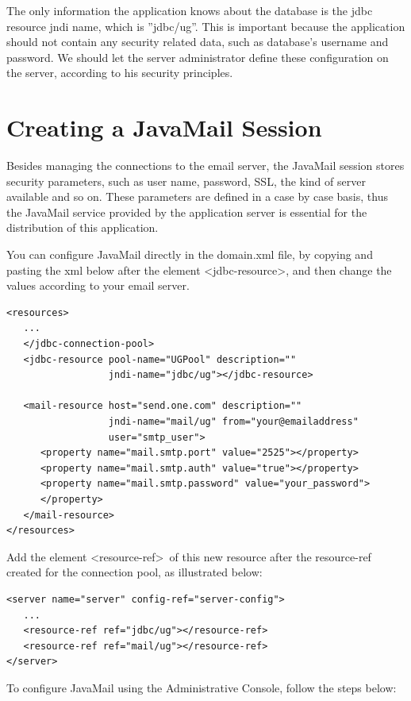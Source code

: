 \documentclass[envcountsame,envcountchap]{svmono}
\begin{document}
The only information the application knows about the database is the jdbc resource jndi name, which is ''jdbc/ug''. This is important because the application should not contain any security related data, such as database's username and password. We should let the server administrator define these configuration on the server, according to his security principles.

\section{Creating a JavaMail Session}

Besides managing the connections to the email server, the JavaMail session stores security parameters, such as user name, password, SSL, the kind of server available and so on. These parameters are defined in a case by case basis, thus the JavaMail service provided by the application server is essential for the distribution of this application.

You can configure JavaMail directly in the domain.xml file, by copying and pasting the xml below after the element \textless jdbc-resource\textgreater, and then change the values according to your email server.

\begin{verbatim}
<resources>
   ...
   </jdbc-connection-pool>
   <jdbc-resource pool-name="UGPool" description="" 
                  jndi-name="jdbc/ug"></jdbc-resource>

   <mail-resource host="send.one.com" description="" 
                  jndi-name="mail/ug" from="your@emailaddress"
                  user="smtp_user">
      <property name="mail.smtp.port" value="2525"></property>
      <property name="mail.smtp.auth" value="true"></property>
      <property name="mail.smtp.password" value="your_password">
      </property>
   </mail-resource>
</resources>
\end{verbatim}

Add the element \textless resource-ref\textgreater \ of this new resource after the resource-ref created for the connection pool, as illustrated below:

\begin{verbatim}
<server name="server" config-ref="server-config">
   ...
   <resource-ref ref="jdbc/ug"></resource-ref>
   <resource-ref ref="mail/ug"></resource-ref>
</server>
\end{verbatim}

To configure JavaMail using the Administrative Console, follow the steps below:
\end{document}
